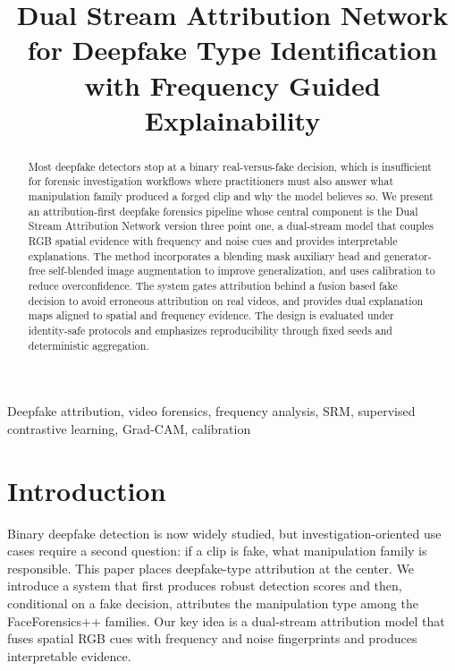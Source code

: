 \documentclass[conference]{IEEEtran}
\begin{document}
\title{Dual Stream Attribution Network for Deepfake Type Identification with Frequency Guided Explainability}

\author{
\and
{}
}

\maketitle

\begin{abstract}
Most deepfake detectors stop at a binary real-versus-fake decision, which is insufficient for forensic investigation workflows where practitioners must also answer what manipulation family produced a forged clip and why the model believes so. We present an attribution-first deepfake forensics pipeline whose central component is the Dual Stream Attribution Network version three point one, a dual-stream model that couples RGB spatial evidence with frequency and noise cues and provides interpretable explanations. The method incorporates a blending mask auxiliary head and generator-free self-blended image augmentation to improve generalization, and uses calibration to reduce overconfidence. The system gates attribution behind a fusion based fake decision to avoid erroneous attribution on real videos, and provides dual explanation maps aligned to spatial and frequency evidence. The design is evaluated under identity-safe protocols and emphasizes reproducibility through fixed seeds and deterministic aggregation.
\end{abstract}

\begin{IEEEkeywords}
Deepfake attribution, video forensics, frequency analysis, SRM, supervised contrastive learning, Grad-CAM, calibration
\end{IEEEkeywords}

\section{Introduction}
Binary deepfake detection is now widely studied, but investigation-oriented use cases require a second question: if a clip is fake, what manipulation family is responsible. This paper places deepfake-type attribution at the center. We introduce a system that first produces robust detection scores and then, conditional on a fake decision, attributes the manipulation type among the FaceForensics++ families. Our key idea is a dual-stream attribution model that fuses spatial RGB cues with frequency and noise fingerprints and produces interpretable evidence.
\end{document}

